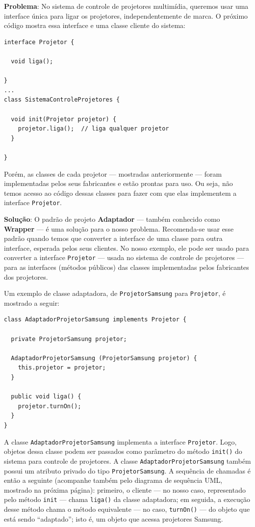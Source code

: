 \documentclass[
  11pt,
  twoside]{book}
\newcommand{\passthrough}[1]{#1}
\begin{document}
\textbf{Problema}: No sistema de controle de projetores multimídia,
queremos usar uma interface única para ligar os projetores,
independentemente de marca. O próximo código mostra essa interface e uma
classe cliente do sistema:

\begin{lstlisting}
interface Projetor {

  void liga();

}
...
class SistemaControleProjetores {

  void init(Projetor projetor) {
    projetor.liga();  // liga qualquer projetor
  }

}
\end{lstlisting}

Porém, as classes de cada projetor --- mostradas anteriormente --- foram
implementadas pelos seus fabricantes e estão prontas para uso. Ou seja,
não temos acesso ao código dessas classes para fazer com que elas
implementem a interface \passthrough{\lstinline!Projetor!}.

 \textbf{Solução}: O padrão de projeto \textbf{Adaptador}
--- também conhecido como \textbf{Wrapper} --- é uma solução para o
nosso problema. Recomenda-se usar esse padrão quando temos que converter
a interface de uma classe para outra interface, esperada pelos seus
clientes. No nosso exemplo, ele pode ser usado para converter a
interface \passthrough{\lstinline!Projetor!} --- usada no sistema de
controle de projetores --- para as interfaces (métodos públicos) das
classes implementadas pelos fabricantes dos projetores.

Um exemplo de classe adaptadora, de
\passthrough{\lstinline!ProjetorSamsung!} para
\passthrough{\lstinline!Projetor!}, é mostrado a seguir:

\begin{lstlisting}
class AdaptadorProjetorSamsung implements Projetor {

  private ProjetorSamsung projetor;

  AdaptadorProjetorSamsung (ProjetorSamsung projetor) {
    this.projetor = projetor;
  }

  public void liga() {
    projetor.turnOn();
  }
}
\end{lstlisting}

A classe \passthrough{\lstinline!AdaptadorProjetorSamsung!} implementa a
interface \passthrough{\lstinline!Projetor!}. Logo, objetos dessa classe
podem ser passados como parâmetro do método
\passthrough{\lstinline!init()!} do sistema para controle de projetores.
A classe \passthrough{\lstinline!AdaptadorProjetorSamsung!} também
possui um atributo privado do tipo
\passthrough{\lstinline!ProjetorSamsung!}. A sequência de chamadas é
então a seguinte (acompanhe também pelo diagrama de sequência UML,
mostrado na próxima página): primeiro, o cliente --- no nosso caso,
representado pelo método \passthrough{\lstinline!init!} --- chama
\passthrough{\lstinline!liga()!} da classe adaptadora; em seguida, a
execução desse método chama o método equivalente --- no caso,
\passthrough{\lstinline!turnOn()!} --- do objeto que está sendo
``adaptado''; isto é, um objeto que acessa projetores Samsung.
\end{document}
